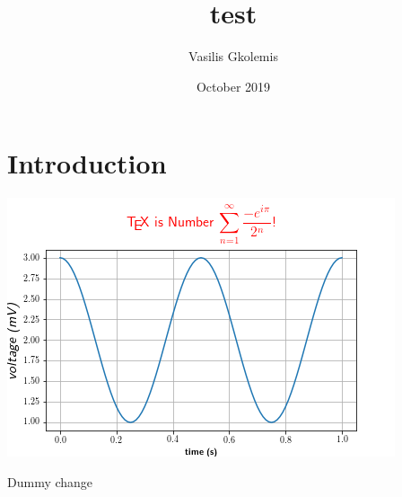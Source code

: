 \documentclass{article}
\title{test}
\author{Vasilis Gkolemis}
\date{October 2019}
\begin{document}
\maketitle

\section{Introduction}

\includegraphics{tex_demo.png}



Dummy change
\end{document}
